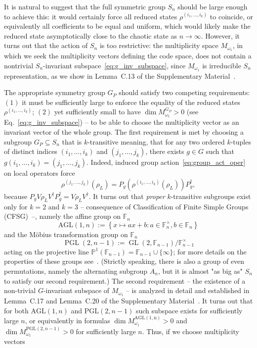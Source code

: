 \documentclass[10pt,twocolumn,superscriptaddress,aps,amsmath,amssymb,citeautoscript,floatfix,prx,longbibliography]{revtex4-2}
\theoremstyle{plain}
\theoremstyle{plain}
\theoremstyle{plain}
\theoremstyle{plain}
\theoremstyle{plain}
\theoremstyle{plain}
\begin{document}
It is natural to suggest that the full symmetric group $S_n$ should be large enough to achieve this: it would certainly force all reduced states $\rho^{(i_1,\ldots,i_k)}$ to coincide, or equivalently all coefficients to be equal and uniform, which would likely make the reduced state asymptotically close to the chaotic state as $n \rightarrow \infty$. However, it turns out that the action of $S_n$ is too restrictive: the multiplicity space $M_{\omega_1}$, in which we seek the multiplicity vectors defining the code space, does not contain a nontrivial $S_n$-invariant subspace~\eqref{eq:g_inv_subspace}, since $M_{\omega_1}$ is irreducible $S_n$ representation, as we show in Lemma~C.13 of the Supplementary Material~\cite{SuppMat}. 

The appropriate symmetry group $G_P$ should satisfy two competing requirements: $(1)$ it must be sufficiently large to enforce the equality of the reduced states $\rho^{(i_1,\ldots,i_k)}$; $(2)$ yet sufficiently small to have $\dim M_{\omega_1}^{G_P}>0$ (see Eq.~\eqref{eq:g_inv_subspace}) -- to be able to choose the multiplicity vector as an invariant vector of the whole group. The first requirement is met by choosing a subgroup $G_P \subseteq S_n$ that is $k$-transitive meaning, that for any two ordered $k$-tuples of distinct indices $\left(i_1, \ldots, i_k\right)$ and $\left(j_1, \ldots, j_k\right)$, there exists $g \in G$ such that $g\left(i_1, \ldots, i_k\right)=\left(j_1, \ldots, j_k\right)$. Indeed, induced group action~\eqref{eq:group_act_oper} on local operators force
\[
    \rho^{(j_1,\ldots,j_k)}(\rho_L)
    =
    P_g\left(\rho^{(i_1,\ldots,i_k)}(\rho_L)\right)P_g^{\dagger},
\]
because $P_g V \rho_L V^{\dagger} P_g^{\dagger}=V \rho_L V^{\dagger}$.
It turns out that \textit{proper} $k$-transitive subgroups exist only for $k=2$ and $k=3$ -- consequence of Classification of Finite Simple Groups (CFSG)~\cite{GorensteinLyonsSolomon1994}--, namely the affine group on $\mathbb{F}_n$
\begin{equation}\label{eq:AGL_def}
\mathrm{AGL}(1, n):=\left\{x \mapsto a x+b: a \in \mathbb{F}_n^{\times}, b \in \mathbb{F}_n\right\}
\end{equation}
and the Möbius transformation group on $\mathbb{F}_n$ 
\begin{equation}\label{eq:PGL_def}
    \operatorname{PGL}(2, n-1):=\operatorname{GL}\left(2, \mathbb{F}_{n-1}\right) / \mathbb{F}_{n-1}^{\times}
\end{equation} 
acting on the projective line $\mathbb{P}^1\left(\mathbb{F}_{n-1}\right)=\mathbb{F}_{n-1} \cup\{\infty\}$; for more details on the properties of these groups see~\cite{DixonMortimer1996}. (Strictly speaking, there is also a group of even permutations, namely the alternating subgroup $A_n$, but it is almost "as big as" $S_n$ to satisfy our second requirement.) The second requirement -- the existence of a non-trivial $G$-invariant subspace of $M_{\omega_1}$ -- is analyzed in detail and established in Lemma~C.17 and Lemma~C.20 of the Supplementary Material~\cite{SuppMat}. It turns out that for both $\mathrm{AGL}(1, n)$ and $\mathrm{PGL}(2, n-1)$ such subspace exists for sufficiently large $n$, or equivalently in formulas $\dim{M_{\omega_1}^{\mathrm{AGL(1, n)}}}>0$ and $\dim{M_{\omega_1}^{\mathrm{PGL}(2, n-1)}}>0$ for sufficiently large $n$. Thus, if we choose multiplicity vectors
\end{document}
